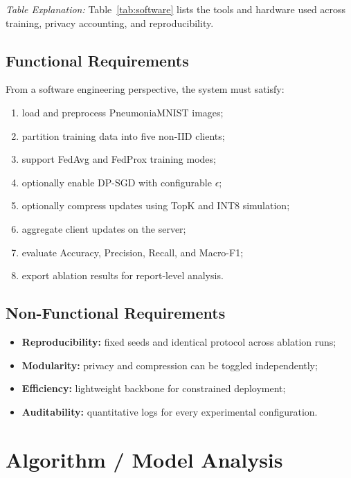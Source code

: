 \noindent\emph{Table Explanation:} Table~\ref{tab:software} lists the tools
and hardware used across training, privacy accounting, and reproducibility.
\FloatBarrier

\subsection{Functional Requirements}
From a software engineering perspective, the system must satisfy:
\begin{enumerate}[leftmargin=*]
  \item load and preprocess PneumoniaMNIST images;
  \item partition training data into five non-IID clients;
  \item support FedAvg and FedProx training modes;
  \item optionally enable DP-SGD with configurable $\epsilon$;
  \item optionally compress updates using TopK and INT8 simulation;
  \item aggregate client updates on the server;
  \item evaluate Accuracy, Precision, Recall, and Macro-F1;
  \item export ablation results for report-level analysis.
\end{enumerate}

\subsection{Non-Functional Requirements}
\begin{itemize}[leftmargin=*]
  \item \textbf{Reproducibility:} fixed seeds and identical protocol across
        ablation runs;
  \item \textbf{Modularity:} privacy and compression can be toggled
        independently;
  \item \textbf{Efficiency:} lightweight backbone for constrained
        deployment;
  \item \textbf{Auditability:} quantitative logs for every experimental
        configuration.
\end{itemize}

\section{Algorithm / Model Analysis}

